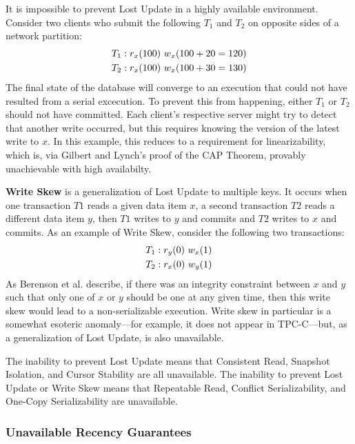 It is impossible to prevent Lost Update in a highly available
environment. Consider two clients who submit the following $T_1$ and
$T_2$ on opposite sides of a network partition:
\begin{align*}
\small
T_1 &: r_x(100)~w_x(100+20=120)
\\T_2 &: r_x(100)~w_x(100+30=130)
\end{align*}
The final state of the database will converge to an execution that
could not have resulted from a serial excecution. To prevent this from
happening, either $T_1$ or $T_2$ should not have committed. Each
client's respective server might try to detect that another write
occurred, but this requires knowing the version of the latest write to
$x$. In this example, this reduces to a requirement for
linearizability, which is, via Gilbert and Lynch's proof of the CAP
Theorem, provably unachievable with high availabilty.

\textbf{Write Skew} is a generalization of Lost Update to multiple
keys. It occurs when one transaction $T1$ reads a given data item $x$,
a second transaction $T2$ reads a different data item $y$, then $T1$
writes to $y$ and commits and $T2$ writes to $x$ and commits. As an
example of Write Skew, consider the following two transactions:
\begin{align*}
\small
T_1 &: r_y(0)~w_x(1)
\\T_2 &: r_x(0)~w_y(1)
\end{align*}
As Berenson et al. describe, if there was an integrity constraint
between $x$ and $y$ such that only one of $x$ or $y$ should be one at
any given time, then this write skew would lead to a non-serializable
execution. Write skew in particular is a somewhat esoteric
anomaly---for example, it does not appear in TPC-C---but, as a
generalization of Lost Update, is also unavailable.

The inability to prevent Lost Update means that Consistent Read,
Snapshot Isolation, and Cursor Stability are all unavailable. The
inability to prevent Lost Update or Write Skew means that Repeatable
Read, Conflict Serializability, and One-Copy Serializability are
unavailable.

\subsubsection{Unavailable Recency Guarantees}

